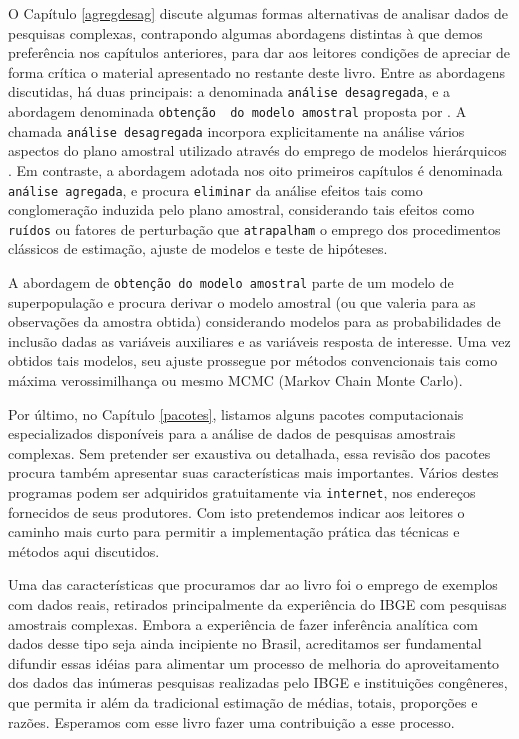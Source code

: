 \documentclass[]{book}
\theoremstyle{definition}
\theoremstyle{definition}
\theoremstyle{definition}
\theoremstyle{remark}
\begin{document}
O Capítulo \ref{agregdesag} discute algumas formas alternativas de
analisar dados de pesquisas complexas, contrapondo algumas abordagens
distintas à que demos preferência nos capítulos anteriores, para dar aos
leitores condições de apreciar de forma crítica o material apresentado
no restante deste livro. Entre as abordagens discutidas, há duas
principais: a denominada \texttt{análise\ desagregada}, e a abordagem
denominada \texttt{obtenção\ \ do\ modelo\ amostral} proposta por
\citep{PKR}. A chamada \texttt{análise\ desagregada} incorpora
explicitamente na análise vários aspectos do plano amostral utilizado
através do emprego de modelos hierárquicos \citep{bryk}. Em contraste, a
abordagem adotada nos oito primeiros capítulos é denominada
\texttt{análise\ agregada}, e procura \texttt{eliminar} da análise
efeitos tais como conglomeração induzida pelo plano amostral,
considerando tais efeitos como \texttt{ruídos} ou fatores de perturbação
que \texttt{atrapalham} o emprego dos procedimentos clássicos de
estimação, ajuste de modelos e teste de hipóteses.

A abordagem de \texttt{obtenção\ do\ modelo\ amostral} parte de um
modelo de superpopulação e procura derivar o modelo amostral (ou que
valeria para as observações da amostra obtida) considerando modelos para
as probabilidades de inclusão dadas as variáveis auxiliares e as
variáveis resposta de interesse. Uma vez obtidos tais modelos, seu
ajuste prossegue por métodos convencionais tais como máxima
verossimilhança ou mesmo MCMC (Markov Chain Monte Carlo).

Por último, no Capítulo \ref{pacotes}, listamos alguns pacotes
computacionais especializados disponíveis para a análise de dados de
pesquisas amostrais complexas. Sem pretender ser exaustiva ou detalhada,
essa revisão dos pacotes procura também apresentar suas características
mais importantes. Vários destes programas podem ser adquiridos
gratuitamente via \texttt{internet}, nos endereços fornecidos de seus
produtores. Com isto pretendemos indicar aos leitores o caminho mais
curto para permitir a implementação prática das técnicas e métodos aqui
discutidos.

Uma das características que procuramos dar ao livro foi o emprego de
exemplos com dados reais, retirados principalmente da experiência do
IBGE com pesquisas amostrais complexas. Embora a experiência de fazer
inferência analítica com dados desse tipo seja ainda incipiente no
Brasil, acreditamos ser fundamental difundir essas idéias para alimentar
um processo de melhoria do aproveitamento dos dados das inúmeras
pesquisas realizadas pelo IBGE e instituições congêneres, que permita ir
além da tradicional estimação de médias, totais, proporções e razões.
Esperamos com esse livro fazer uma contribuição a esse processo.
\end{document}
